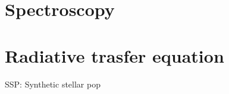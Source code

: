 \section{Spectroscopy}

\section{Radiative trasfer equation}

\begin{frame}{SSP: Synthetic stellar pop}

\end{frame}